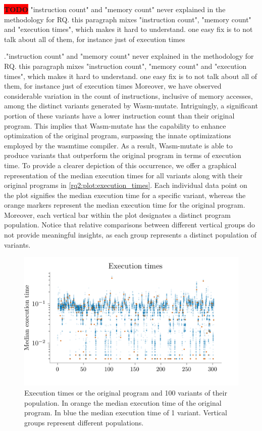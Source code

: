 \documentclass[sigplan,screen]{acmart}
\newcommand*\badge[1]{ \colorbox{red}{\color{white}#1}}
\newcommand{\tool}{Wasm-mutate\xspace}
\newcommand{\todo}[1]{%
\refstepcounter{todo}
\noindent\textbf{\badge{TODO}} {\color{red}#1}
\addcontentsline{td}{todo}
{\color{red}\thesection.\thetodo\xspace #1}}
\begin{document}
\todo{"instruction count" and "memory count" never explained in the methodology for RQ. this paragraph mixes "instruction count", "memory count" and "execution times", which makes it hard to understand. one easy fix is to not talk about all of them, for instance just of execution times}
Moreover, we have observed considerable variation in the count of instructions, inclusive of memory accesses, among the distinct variants generated by \tool.
Intriguingly, a significant portion of these variants have a lower instruction count than their original program. 
This implies that \tool has the capability to enhance optimization of the original program, surpassing the innate optimizations employed by the wasmtime compiler. 
As a result, \tool is able to produce variants that outperform the original program in terms of execution time.
To provide a clearer depiction of this occurrence, we offer a graphical representation of the median execution times for all variants along with their original programs in \autoref{rq2:plot:execution_times}. 
Each individual data point on the plot signifies the median execution time for a specific variant, whereas the orange markers represent the median execution time for the original program.
Moreover, each vertical bar within the plot designates a distinct program population. 
Notice that relative comparisons between different vertical groups do not provide meaningful insights, as each group represents a distinct population of variants.

\begin{figure}
    \centering
    \includegraphics[width=\linewidth]{plots/rq2/times.png}
    \caption{Execution times or the original program and 100 variants of their population. In orange the median execution time of the original program. In blue the median execution time of 1 variant. Vertical groups represent different populations.}
  \label{rq2:plot:execution_times}
\end{figure}
\end{document}
